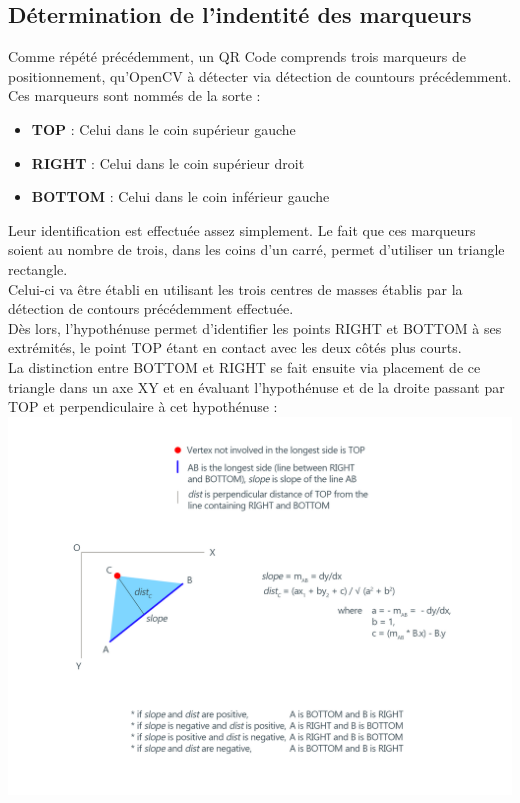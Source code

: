 \documentclass{report}
\begin{document}
		\subsection{Détermination de l'indentité des marqueurs}

			Comme répété précédemment, un QR Code comprends trois marqueurs de positionnement, qu'OpenCV à détecter via détection de countours précédemment.\\

			Ces marqueurs sont nommés de la sorte : \\

			\begin{itemize}
				\item \textbf{TOP} : Celui dans le coin supérieur gauche
				\item \textbf{RIGHT} : Celui dans le coin supérieur droit
				\item \textbf{BOTTOM} : Celui dans le coin inférieur gauche\\
			\end{itemize}

			Leur identification est effectuée assez simplement. Le fait que ces marqueurs soient au nombre de trois, dans les coins d'un carré, permet d'utiliser un triangle rectangle.\\
			Celui-ci va être établi en utilisant les trois centres de masses établis par la détection de contours précédemment effectuée.\\
			Dès lors, l'hypothénuse permet d'identifier les points RIGHT et BOTTOM à ses extrémités, le point TOP étant en contact avec les deux côtés plus courts.\\

			La distinction entre BOTTOM et RIGHT se fait ensuite via placement de ce triangle dans un axe XY et en évaluant l'hypothénuse et de la droite passant par TOP et perpendiculaire à cet hypothénuse : \\

			\includegraphics[scale=0.3]{align.png}
\end{document}

